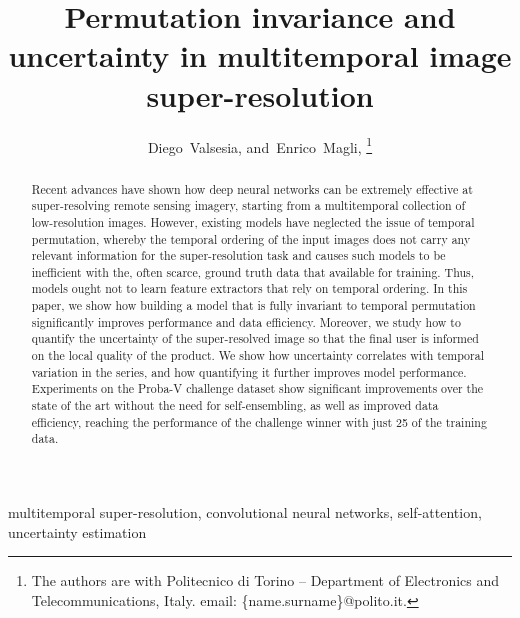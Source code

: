 \documentclass[journal]{IEEEtran}
\begin{document}
\title{Permutation invariance and uncertainty in multitemporal image super-resolution}


\author{Diego~Valsesia, 
        and~Enrico~Magli, \thanks{The authors are with Politecnico di Torino -- Department of Electronics and Telecommunications, Italy. email: \{name.surname\}@polito.it.}
}




















\maketitle

\begin{abstract}
Recent advances have shown how deep neural networks can be extremely effective at super-resolving remote sensing imagery, starting from a multitemporal collection of low-resolution images. However, existing models have neglected the issue of temporal permutation, whereby the temporal ordering of the input images does not carry any relevant information for the super-resolution task and causes such models to be inefficient with the, often scarce, ground truth data that available for training. Thus, models ought not to learn feature extractors that rely on temporal ordering. In this paper, we show how building a model that is fully invariant to temporal permutation significantly improves performance and data efficiency. Moreover, we study how to quantify the uncertainty of the super-resolved image so that the final user is informed on the local quality of the product. We show how uncertainty correlates with temporal variation in the series, and how quantifying it further improves model performance. Experiments on the Proba-V challenge dataset show significant improvements over the state of the art without the need for self-ensembling, as well as improved data efficiency, reaching the performance of the challenge winner with just 25 of the training data.
\end{abstract}

\begin{IEEEkeywords}
multitemporal super-resolution, convolutional neural networks, self-attention, uncertainty estimation 
\end{IEEEkeywords}
\end{document}
